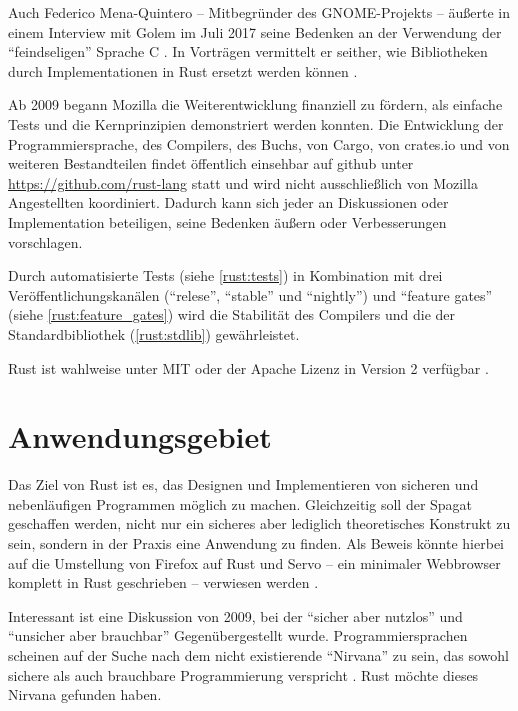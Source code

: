 Auch Federico Mena-Quintero -- Mitbegründer des GNOME-Projekts \cite{rust:gnome:federico}  --
äußerte in einem Interview mit Golem im Juli 2017 seine Bedenken an der Verwendung der \enquote{feindseligen} Sprache C \cite{rust:c_is_hostile_golem}.
In Vorträgen vermittelt er seither, wie Bibliotheken durch Implementationen in Rust ersetzt werden können \cite{rust:c_is_hostile_mena}.

Ab 2009 begann Mozilla die Weiterentwicklung finanziell zu fördern, als einfache Tests und die Kernprinzipien demonstriert werden konnten.
Die Entwicklung der Programmiersprache, des Compilers, des Buchs, von Cargo, von crates.io und von weiteren Bestandteilen findet öffentlich einsehbar auf \gls{github}  unter \url{https://github.com/rust-lang} statt und wird nicht ausschließlich von Mozilla Angestellten koordiniert.
Dadurch kann sich jeder an Diskussionen oder Implementation beteiligen, seine Bedenken äußern oder Verbesserungen vorschlagen.

Durch automatisierte Tests (siehe \autoref{rust:tests}) in Kombination mit drei Veröffentlichungskanälen (\enquote{relese}, \enquote{stable} und \enquote{nightly}) und \enquote{feature gates} (siehe \autoref{rust:feature_gates}) wird die Stabilität des Compilers und die der Standardbibliothek (\autoref{rust:stdlib}) gewährleistet.

Rust ist wahlweise unter MIT oder der Apache Lizenz in Version 2 verfügbar \cite{rust:copyright}.

\section{Anwendungsgebiet}

Das Ziel von Rust ist es, das Designen und Implementieren von sicheren und nebenläufigen Programmen möglich zu machen.
Gleichzeitig soll der Spagat geschaffen werden, nicht nur ein sicheres aber lediglich theoretisches Konstrukt zu sein, sondern  in der Praxis eine Anwendung zu finden.
Als Beweis könnte hierbei auf die Umstellung von Firefox auf Rust und Servo -- ein minimaler Webbrowser komplett in Rust geschrieben -- verwiesen werden \cite{rust:faq}.

Interessant ist eine Diskussion von 2009, bei der \enquote{sicher aber nutzlos} und \enquote{unsicher aber brauchbar} Gegenübergestellt wurde.
Programmiersprachen scheinen auf der Suche nach dem nicht existierende \enquote{Nirvana} zu sein, das sowohl sichere als auch brauchbare Programmierung verspricht \cite[ab ca Minute 58:20]{rust:infoq:null}.
Rust möchte dieses Nirvana gefunden haben.

